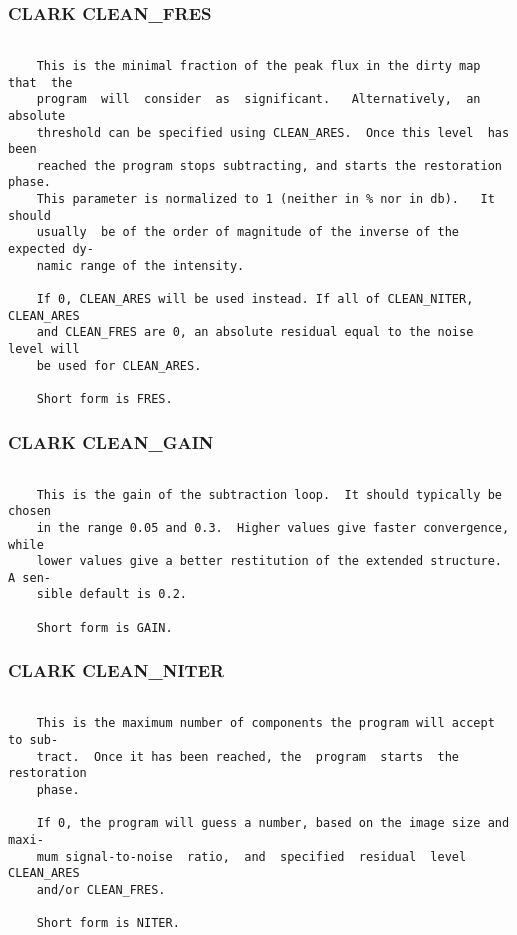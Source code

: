 \subsubsection{CLARK CLEAN\_FRES}
\begin{verbatim}

    This is the minimal fraction of the peak flux in the dirty map that  the
    program  will  consider  as  significant.   Alternatively,  an  absolute
    threshold can be specified using CLEAN_ARES.  Once this level  has  been
    reached the program stops subtracting, and starts the restoration phase.
    This parameter is normalized to 1 (neither in % nor in db).   It  should
    usually  be of the order of magnitude of the inverse of the expected dy-
    namic range of the intensity.

    If 0, CLEAN_ARES will be used instead. If all of CLEAN_NITER, CLEAN_ARES
    and CLEAN_FRES are 0, an absolute residual equal to the noise level will
    be used for CLEAN_ARES.

    Short form is FRES.

\end{verbatim}
\subsubsection{CLARK CLEAN\_GAIN}
\begin{verbatim}

    This is the gain of the subtraction loop.  It should typically be chosen
    in the range 0.05 and 0.3.  Higher values give faster convergence, while
    lower values give a better restitution of the extended structure. A sen-
    sible default is 0.2.

    Short form is GAIN.

\end{verbatim}
\subsubsection{CLARK CLEAN\_NITER}
\begin{verbatim}

    This is the maximum number of components the program will accept to sub-
    tract.  Once it has been reached, the  program  starts  the  restoration
    phase.

    If 0, the program will guess a number, based on the image size and maxi-
    mum signal-to-noise  ratio,  and  specified  residual  level  CLEAN_ARES
    and/or CLEAN_FRES.

    Short form is NITER.

\end{verbatim}
